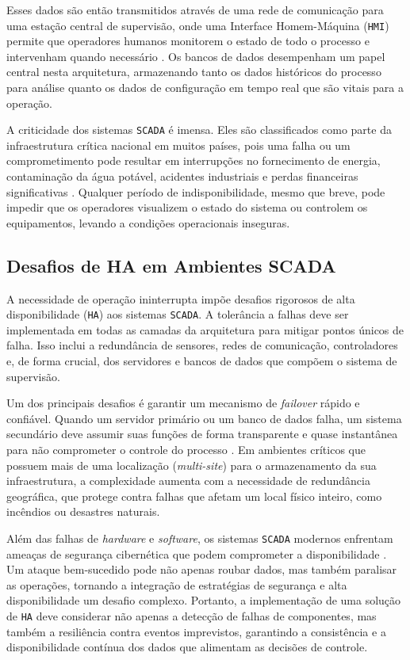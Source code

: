         Esses dados são então transmitidos através de uma rede de comunicação para uma estação central de supervisão, onde uma Interface Homem-Máquina (\verb|HMI|) permite que operadores humanos monitorem o estado de todo o processo e intervenham quando necessário \cite{yadav2021}. Os bancos de dados desempenham um papel central nesta arquitetura, armazenando tanto os dados históricos do processo para análise quanto os dados de configuração em tempo real que são vitais para a operação.
        
        A criticidade dos sistemas \verb|SCADA| é imensa. Eles são classificados como parte da infraestrutura crítica nacional em muitos países, pois uma falha ou um comprometimento pode resultar em interrupções no fornecimento de energia, contaminação da água potável, acidentes industriais e perdas financeiras significativas \cite{alanazi2023}. Qualquer período de indisponibilidade, mesmo que breve, pode impedir que os operadores visualizem o estado do sistema ou controlem os equipamentos, levando a condições operacionais inseguras.

    \subsection{Desafios de HA em Ambientes SCADA}

        A necessidade de operação ininterrupta impõe desafios rigorosos de alta disponibilidade (\verb|HA|) aos sistemas \verb|SCADA|. A tolerância a falhas deve ser implementada em todas as camadas da arquitetura para mitigar pontos únicos de falha. Isso inclui a redundância de sensores, redes de comunicação, controladores e, de forma crucial, dos servidores e bancos de dados que compõem o sistema de supervisão.

        Um dos principais desafios é garantir um mecanismo de \textit{failover} rápido e confiável. Quando um servidor primário ou um banco de dados falha, um sistema secundário deve assumir suas funções de forma transparente e quase instantânea para não comprometer o controle do processo \cite{yadav2021}. Em ambientes críticos que possuem mais de uma localização (\textit{multi-site}) para o armazenamento da sua infraestrutura, a complexidade aumenta com a necessidade de redundância geográfica, que protege contra falhas que afetam um local físico inteiro, como incêndios ou desastres naturais.
        
        Além das falhas de \textit{hardware} e \textit{software}, os sistemas \verb|SCADA| modernos enfrentam ameaças de segurança cibernética que podem comprometer a disponibilidade \cite{alanazi2023}. Um ataque bem-sucedido pode não apenas roubar dados, mas também paralisar as operações, tornando a integração de estratégias de segurança e alta disponibilidade um desafio complexo. Portanto, a implementação de uma solução de \verb|HA| deve considerar não apenas a detecção de falhas de componentes, mas também a resiliência contra eventos imprevistos, garantindo a consistência e a disponibilidade contínua dos dados que alimentam as decisões de controle.

